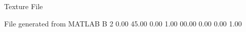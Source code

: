 Texture File

File generated from MATLAB
B 2
   0.00   45.00   0.00   1.00
   00.00   0.00   0.00   1.00